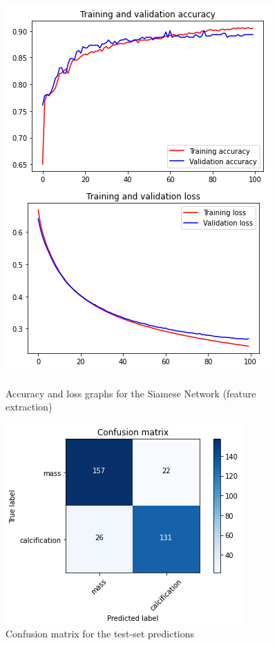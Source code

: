 \documentclass[11pt,a4paper,oneside]{article}
\begin{document}
\begin{figure}[h]
\centering
	\begin{minipage}[c]{.35\textwidth}
		\centering\setlength{\captionmargin}{0pt}%
		\includegraphics[width=.9\textwidth]{images/4.1/Siamese/Accuracy_fe}
		\caption{Accuracy and loss graphs for the Siamese Network (feature extraction)}
		\label{fig:scratch_accuracy}
	\end{minipage}
	\hspace{5mm}%
	\begin{minipage}[c]{.35\textwidth}
		\centering\setlength{\captionmargin}{0pt}%
		\includegraphics[width=.9\textwidth]{images/4.1/Siamese/Conf_Matrix_fe}
		\caption{Confusion matrix for the test-set predictions}
		\label{fig:scratch_matrix}
	\end{minipage}%
\end{figure}
\end{document}
